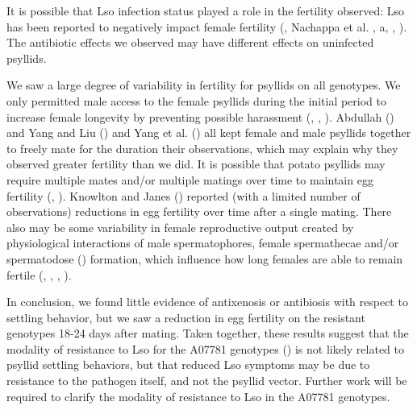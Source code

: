 \documentclass{UIdahoMastersThesis}
\begin{document}
It is possible that Lso infection status played a role in the fertility observed: Lso has been reported to negatively impact female fertility (\cite{Frias2018}, Nachappa et al. \citeyear{Nachappa2012}, \citeyear{Nachappa2012a}a, \citeyear{Nachappa2014}, \cite{Yao2016}). The antibiotic effects we observed may have different effects on uninfected psyllids.
 
We saw a large degree of variability in fertility for psyllids on all genotypes. We only permitted male access to the female psyllids during the initial period to increase female longevity by preventing possible harassment (\cite{Abdullah2008}, \cite{Arnqvist2013}, \cite{Wenninger2008}). Abdullah (\citeyear{Abdullah2008}) and Yang and Liu (\citeyear{Yang2009}) and Yang et al. (\citeyear{Yang2013}) all kept female and male psyllids together to freely mate for the duration their observations, which may explain why they observed greater fertility than we did. It is possible that potato psyllids may require multiple mates and/or multiple matings over time to maintain egg fertility (\cite{Arnqvist2013}, \cite{Wenninger2008}). Knowlton and Janes (\citeyear{Knowlton1931}) reported (with a limited number of observations) reductions in egg fertility over time after a single mating. There also may be some variability in female reproductive output created by physiological interactions of male spermatophores, female spermathecae and/or spermatodose (\cite{Marchini2011}) formation, which influence how long females are able to remain fertile (\cite{Abe2015}, \cite{Qazi2010}, \cite{Schnakenberg2011}, \cite{Wolfner2011}).

In conclusion, we found little evidence of antixenosis or antibiosis with respect to settling behavior, but we saw a reduction in egg fertility on the resistant genotypes 18-24 days after mating.
Taken together, these results suggest that the modality of resistance to Lso for the A07781 genotypes (\cite{Rashidi2017}) is not likely related to psyllid settling behaviors, but that reduced Lso symptoms may be due to resistance to the pathogen itself, and not the psyllid vector. Further work will be required to clarify the modality of resistance to Lso in the A07781 genotypes. 




\newpage
\end{document}
